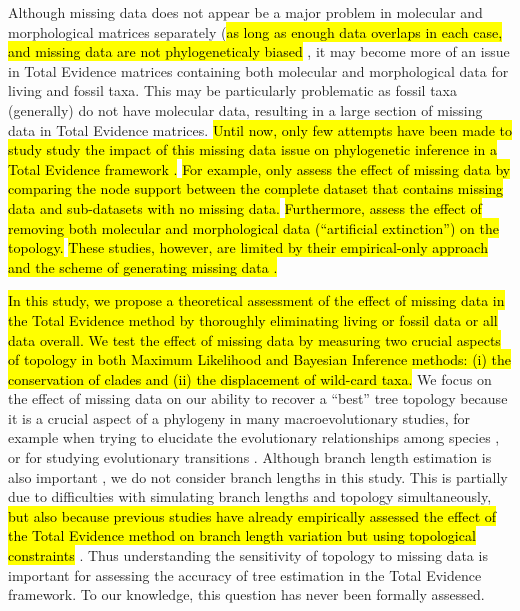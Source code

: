 \documentclass[12pt,letterpaper]{article}
\begin{document}
Although missing data does not appear be a major problem in molecular and morphological matrices separately (\hl{as long as enough data overlaps in each case, and missing data are not phylogeneticaly biased} \citep{wiensmissing2003,Wiens01102005,wiensmissing2006,wiensmissing2008,lemmonthe2009,Sanderson22072011,rouresite-specific2011,pattinsonphylogeny2014}, it may become more of an issue in Total Evidence matrices containing both molecular and morphological data for living and fossil taxa.
This may be particularly problematic as fossil taxa (generally) do not have molecular data, resulting in a large section of missing data in Total Evidence matrices.
\hl{Until now, only few attempts have been made to study study the impact of this missing data issue on phylogenetic inference in a Total Evidence framework \protect\citep[\hl{i.e. using combined molecular and morphological data}; e.g.][]{Wiens01102005,pattinsonphylogeny2014}.}
\hl{For example, \protect\cite{Wiens01102005} }\hl{only assess the effect of missing data by comparing the node support between the complete dataset that contains missing data and sub-datasets with no missing data.}
\hl{Furthermore, \protect\cite{pattinsonphylogeny2014} }\hl{assess the effect of removing both molecular and morphological data (``artificial extinction'') on the topology.}
\hl{These studies, however, are limited by their empirical-only approach \protect\citep{Wiens01102005} }\hl{and the scheme of generating missing data \protect\citep{pattinsonphylogeny2014}.}

\hl{In this study, we propose a theoretical assessment of the effect of missing data in the Total Evidence method by thoroughly eliminating living or fossil data or all data overall.
We test the effect of missing data by measuring two crucial aspects of topology in both Maximum Likelihood and Bayesian Inference methods: (i) the conservation of clades and (ii) the displacement of wild-card taxa.}
We focus on the effect of missing data on our ability to recover a ``best'' tree topology because it is a crucial aspect of a phylogeny in many macroevolutionary studies, for example when trying to elucidate the evolutionary relationships among species \citep[e.g.][]{meredithimpacts2011,jetzthe2012}, or for studying evolutionary transitions \citep[e.g.][]{friedmanexplosive2010}.
Although branch length estimation is also important \citep[namely for timing extinction and/or speciation events; e.g.][]{ronquista2012}, we do not consider branch lengths in this study.
This is partially due to difficulties with simulating branch lengths and topology simultaneously, \hl{but also because previous studies have already empirically assessed the effect of the Total Evidence method on branch length variation but using topological constraints} \citep{ronquista2012,schragocombining2013,slaterphylogenetic2013,beckancient2014}.
Thus understanding the sensitivity of topology to missing data is important for assessing the accuracy of tree estimation in the Total Evidence framework. To our knowledge, this question has never been formally assessed.
\end{document}
